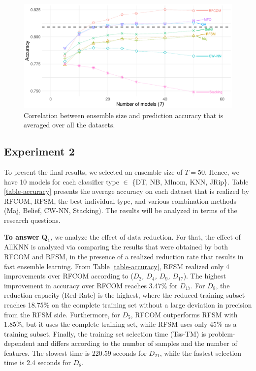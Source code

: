 \begin{figure}[!ht]
\centering
\includegraphics[width=.9\textwidth]{4_Taxonomy/figures/fig-Ens-plot.pdf}
\caption{Correlation between ensemble size and prediction accuracy that is averaged over all the datasets.}
\label{Ens-plot}
\end{figure}




\subsection{Experiment 2} \label{comb.SI}
To present the final results, we selected an ensemble size of $T=50$. Hence, we have 10 models for each classifier type $\in$ \{DT, NB, Mlnom, KNN, JRip\}. Table  \ref{table-accuracy} presents the average accuracy on each dataset that is realized by RFCOM, RFSM, the best individual type, and various combination methods (Maj, Belief, CW-NN, Stacking). The results will be analyzed in terms of the research questions.  

\textbf{To answer} $\pmb{Q_1}$, we analyze the effect of data reduction. For that, the effect of AllKNN \cite{tomek1976} is analyzed via comparing the results that were obtained by both RFCOM and RFSM, in the presence of a realized reduction rate that results in fast ensemble learning. From Table \ref{table-accuracy}, RFSM realized only 4 improvements over RFCOM according to (\textit{$D_2$, $D_4$, $D_9$, $D_{17}$}). The highest improvement in accuracy over RFCOM reaches 3.47\% for \textit{$D_{17}$}. For \textit{$D_8$}, the reduction capacity (Red-Rate) is the highest, where the reduced training subset reaches 18.75\% on the complete training set without a large deviation in precision from the RFSM side. Furthermore, for \textit{$D_5$}, RFCOM outperforms RFSM with 1.85\%, but it uses the complete training set, while RFSM uses only 45\% as a training subset. Finally, the training set selection time (Tss-TM) is problem-dependent and differs according to the number of samples and the number of features. The slowest time is 220.59 seconds for \textit{$D_{21}$}, while the fastest selection time is 2.4 seconds for \textit{$D_8$}.


